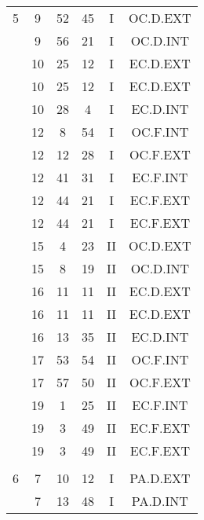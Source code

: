\documentclass[12pt, a4paper]{article}
\begin{document}
\begin{multicols}{3}
{\begin{tabular}{c c c c c c}
	 	 	 	5 & 9 & 52 & 45 & I & OC.D.EXT\\%
	 	 	 	 & 9 & 56 & 21 & I & OC.D.INT\\%
	 	 	 	 & 10 & 25 & 12 & I & EC.D.EXT\\%
	 	 	 	 & 10 & 25 & 12 & I & EC.D.EXT\\%
	 	 	 	 & 10 & 28 & 4 & I & EC.D.INT\\%
	 	 	 	 & 12 & 8 & 54 & I & OC.F.INT\\%
	 	 	 	 & 12 & 12 & 28 & I & OC.F.EXT\\%
	 	 	 	 & 12 & 41 & 31 & I & EC.F.INT\\%
	 	 	 	 & 12 & 44 & 21 & I & EC.F.EXT\\%
	 	 	 	 & 12 & 44 & 21 & I & EC.F.EXT\\%
	 	 	 	 & 15 & 4 & 23 & II & OC.D.EXT\\%
	 	 	 	 & 15 & 8 & 19 & II & OC.D.INT\\%
	 	 	 	 & 16 & 11 & 11 & II & EC.D.EXT\\%
	 	 	 	 & 16 & 11 & 11 & II & EC.D.EXT\\%
	 	 	 	 & 16 & 13 & 35 & II & EC.D.INT\\%
	 	 	 	 & 17 & 53 & 54 & II & OC.F.INT\\%
	 	 	 	 & 17 & 57 & 50 & II & OC.F.EXT\\%
	 	 	 	 & 19 & 1 & 25 & II & EC.F.INT\\%
	 	 	 	 & 19 & 3 & 49 & II & EC.F.EXT\\%
	 	 	 	 & 19 & 3 & 49 & II & EC.F.EXT\\%
	 	 	 	 & & & & & \\%
	 	 	 	6 & 7 & 10 & 12 & I & PA.D.EXT\\%
	 	 	 	 & 7 & 13 & 48 & I & PA.D.INT\\%

\end{tabular}}
\end{multicols}
\end{document}
